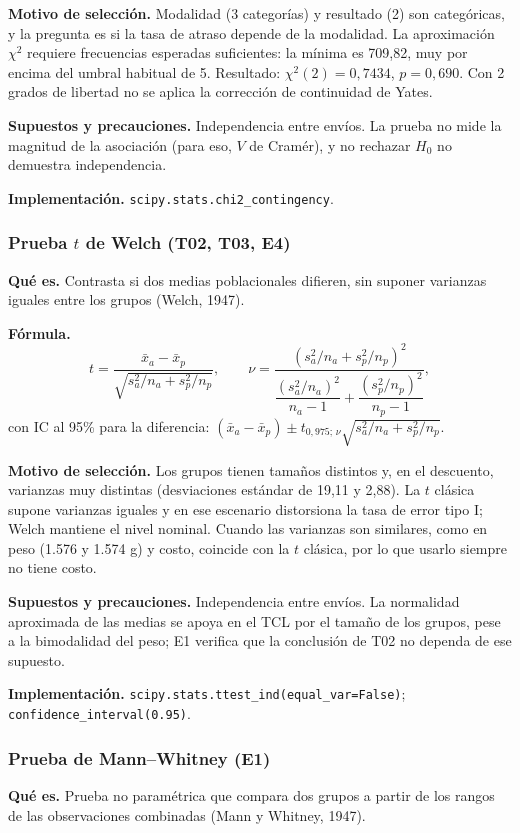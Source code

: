 \documentclass[10pt,a4paper]{article}
\begin{document}
\textbf{Motivo de selección.} Modalidad (3 categorías) y resultado (2) son categóricas, y la pregunta es si la tasa de atraso depende de la modalidad. La aproximación $\chi^2$ requiere frecuencias esperadas suficientes: la mínima es 709,82, muy por encima del umbral habitual de 5. Resultado: $\chi^2(2)=0{,}7434$, $p=0{,}690$. Con 2 grados de libertad no se aplica la corrección de continuidad de Yates.

\textbf{Supuestos y precauciones.} Independencia entre envíos. La prueba no mide la magnitud de la asociación (para eso, $V$ de Cramér), y no rechazar $H_0$ no demuestra independencia.

\textbf{Implementación.} \texttt{scipy.stats.chi2\_contingency}.

\subsubsection{Prueba \texorpdfstring{$t$}{t} de Welch (T02, T03, E4)}
\textbf{Qué es.} Contrasta si dos medias poblacionales difieren, sin suponer varianzas iguales entre los grupos (Welch, 1947).

\textbf{Fórmula.}
\[
t=\frac{\bar x_a-\bar x_p}{\sqrt{s_a^2/n_a+s_p^2/n_p}},\qquad
\nu=\frac{\left(s_a^2/n_a+s_p^2/n_p\right)^2}{\dfrac{(s_a^2/n_a)^2}{n_a-1}+\dfrac{(s_p^2/n_p)^2}{n_p-1}},
\]
con IC al 95\% para la diferencia: $(\bar x_a-\bar x_p)\pm t_{0{,}975;\,\nu}\sqrt{s_a^2/n_a+s_p^2/n_p}$.

\textbf{Motivo de selección.} Los grupos tienen tamaños distintos y, en el descuento, varianzas muy distintas (desviaciones estándar de 19,11 y 2,88). La $t$ clásica supone varianzas iguales y en ese escenario distorsiona la tasa de error tipo I; Welch mantiene el nivel nominal. Cuando las varianzas son similares, como en peso (1.576 y 1.574 g) y costo, coincide con la $t$ clásica, por lo que usarlo siempre no tiene costo.

\textbf{Supuestos y precauciones.} Independencia entre envíos. La normalidad aproximada de las medias se apoya en el TCL por el tamaño de los grupos, pese a la bimodalidad del peso; E1 verifica que la conclusión de T02 no dependa de ese supuesto.

\textbf{Implementación.} \texttt{scipy.stats.ttest\_ind(equal\_var=False)}; \texttt{confidence\_interval(0.95)}.

\subsubsection{Prueba de Mann--Whitney (E1)}
\textbf{Qué es.} Prueba no paramétrica que compara dos grupos a partir de los rangos de las observaciones combinadas (Mann y Whitney, 1947).
\end{document}
